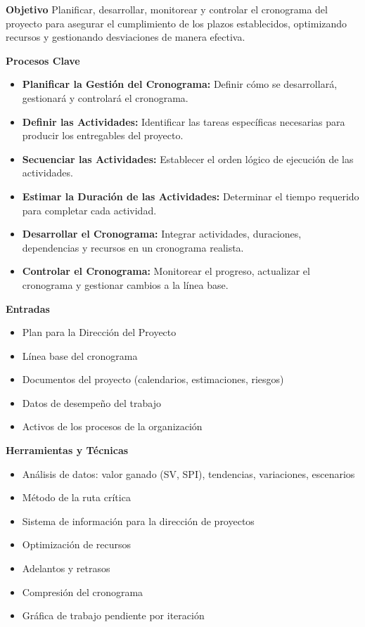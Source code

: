     \textbf{Objetivo}
    Planificar, desarrollar, monitorear y controlar el cronograma del proyecto para asegurar el cumplimiento de los plazos establecidos, optimizando recursos y gestionando desviaciones de manera efectiva.

    \begin{multicols}{2}
      \textbf{Procesos Clave}
    \begin{itemize}
        \item \textbf{Planificar la Gestión del Cronograma:} Definir cómo se desarrollará, gestionará y controlará el cronograma.
        \item \textbf{Definir las Actividades:} Identificar las tareas específicas necesarias para producir los entregables del proyecto.
        \item \textbf{Secuenciar las Actividades:} Establecer el orden lógico de ejecución de las actividades.
        \item \textbf{Estimar la Duración de las Actividades:} Determinar el tiempo requerido para completar cada actividad.
        \item \textbf{Desarrollar el Cronograma:} Integrar actividades, duraciones, dependencias y recursos en un cronograma realista.
        \item \textbf{Controlar el Cronograma:} Monitorear el progreso, actualizar el cronograma y gestionar cambios a la línea base.
    \end{itemize}

    \textbf{Entradas}
    \begin{itemize}
        \item Plan para la Dirección del Proyecto
        \item Línea base del cronograma
        \item Documentos del proyecto (calendarios, estimaciones, riesgos)
        \item Datos de desempeño del trabajo
        \item Activos de los procesos de la organización
    \end{itemize}

    \textbf{Herramientas y Técnicas}
    \begin{itemize}
        \item Análisis de datos: valor ganado (SV, SPI), tendencias, variaciones, escenarios
        \item Método de la ruta crítica
        \item Sistema de información para la dirección de proyectos
        \item Optimización de recursos
        \item Adelantos y retrasos
        \item Compresión del cronograma
        \item Gráfica de trabajo pendiente por iteración
    \end{itemize}


\end{multicols}
